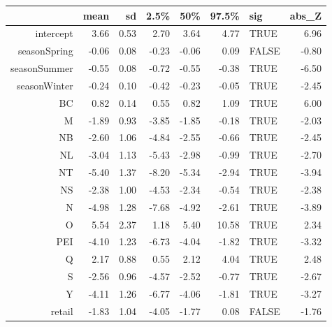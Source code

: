 \begin{table}[ht]
\centering
\begin{tabular}{rrrrrrlr}
  \hline
 & mean & sd & 2.5\% & 50\% & 97.5\% & sig & abs\_Z \\ 
  \hline
intercept & 3.66 & 0.53 & 2.70 & 3.64 & 4.77 & TRUE & 6.96 \\ 
  seasonSpring & -0.06 & 0.08 & -0.23 & -0.06 & 0.09 & FALSE & -0.80 \\ 
  seasonSummer & -0.55 & 0.08 & -0.72 & -0.55 & -0.38 & TRUE & -6.50 \\ 
  seasonWinter & -0.24 & 0.10 & -0.42 & -0.23 & -0.05 & TRUE & -2.45 \\ 
  BC & 0.82 & 0.14 & 0.55 & 0.82 & 1.09 & TRUE & 6.00 \\ 
  M & -1.89 & 0.93 & -3.85 & -1.85 & -0.18 & TRUE & -2.03 \\ 
  NB & -2.60 & 1.06 & -4.84 & -2.55 & -0.66 & TRUE & -2.45 \\ 
  NL & -3.04 & 1.13 & -5.43 & -2.98 & -0.99 & TRUE & -2.70 \\ 
  NT & -5.40 & 1.37 & -8.20 & -5.34 & -2.94 & TRUE & -3.94 \\ 
  NS & -2.38 & 1.00 & -4.53 & -2.34 & -0.54 & TRUE & -2.38 \\ 
  N & -4.98 & 1.28 & -7.68 & -4.92 & -2.61 & TRUE & -3.89 \\ 
  O & 5.54 & 2.37 & 1.18 & 5.40 & 10.58 & TRUE & 2.34 \\ 
  PEI & -4.10 & 1.23 & -6.73 & -4.04 & -1.82 & TRUE & -3.32 \\ 
  Q & 2.17 & 0.88 & 0.55 & 2.12 & 4.04 & TRUE & 2.48 \\ 
  S & -2.56 & 0.96 & -4.57 & -2.52 & -0.77 & TRUE & -2.67 \\ 
  Y & -4.11 & 1.26 & -6.77 & -4.06 & -1.81 & TRUE & -3.27 \\ 
  retail & -1.83 & 1.04 & -4.05 & -1.77 & 0.08 & FALSE & -1.76 \\ 
   \hline
\end{tabular}
\end{table}
